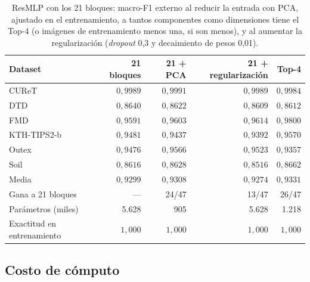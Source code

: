 \documentclass[11pt,a4paper]{article}
\begin{document}
\begin{table}[H]
\centering\fontsize{8}{10}\selectfont\setlength{\tabcolsep}{3.0pt}
\caption{ResMLP con los 21 bloques: macro-F1 externo al reducir la entrada con PCA, ajustado en el entrenamiento, a tantos componentes como dimensiones tiene el Top-4 (o imágenes de entrenamiento menos una, si son menos), y al aumentar la regularización (\emph{dropout} 0,3 y decaimiento de pesos 0,01).}
\label{tab:sel-capacity}
\begin{tabular}{@{}lrrrr@{}}
\toprule
Dataset & 21 bloques & 21 + PCA & 21 + regularización & Top-4 \\
\midrule
CUReT & $0{,}9989$ & $0{,}9991$ & $0{,}9989$ & $0{,}9984$ \\
DTD & $0{,}8640$ & $0{,}8622$ & $0{,}8609$ & $0{,}8612$ \\
FMD & $0{,}9591$ & $0{,}9603$ & $0{,}9614$ & $0{,}9800$ \\
KTH-TIPS2-b & $0{,}9481$ & $0{,}9437$ & $0{,}9392$ & $0{,}9570$ \\
Outex & $0{,}9476$ & $0{,}9566$ & $0{,}9523$ & $0{,}9357$ \\
Soil & $0{,}8616$ & $0{,}8628$ & $0{,}8516$ & $0{,}8662$ \\
\midrule
Media & $0{,}9299$ & $0{,}9308$ & $0{,}9274$ & $0{,}9331$ \\
Gana a 21 bloques & --- & 24/47 & 13/47 & 26/47 \\
Parámetros (miles) & 5.628 & 905 & 5.628 & 1.218 \\
Exactitud en entrenamiento & $1{,}000$ & $1{,}000$ & $1{,}000$ & $1{,}000$ \\
\bottomrule
\end{tabular}
\end{table}

\subsection{Costo de cómputo}
\end{document}
